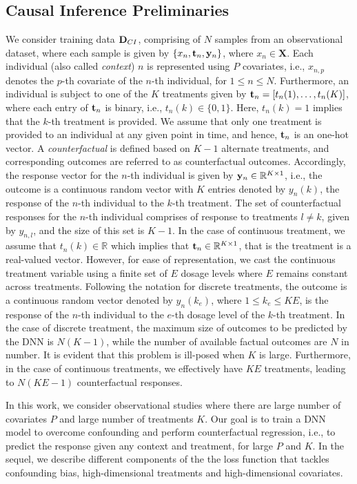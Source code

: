 \documentclass[twoside,11pt]{article}
\begin{document}
\subsection{Causal Inference Preliminaries}
\label{sec:prelim}
We consider training data $\mathbf{D}_{CI}$, comprising of $N$ samples from an observational dataset, where each sample is given by $\{x_n,\mathbf{t}_n,\mathbf{y}_{n}\}$, where $x_n \in \mathbf{X}$. Each individual (also called \textit{context}) $n$ is represented using $P$ covariates, i.e., $x_{n,p}$ denotes the $p$-th covariate of the $n$-th individual, for $1\leq n \leq N$. Furthermore, an individual is subject to one of the $K$ treatments given by $\mathbf{t}_n = [t_n(1), \hdots, t_n(K)]$, where each entry of $\mathbf{t}_n$ is binary, i.e., $t_n(k) \in \{0,1\}$. Here, $t_n(k) = 1$ implies that the $k$-th treatment is provided. We assume that only one treatment is provided to an individual at any given point in time, and hence, $\mathbf{t}_n$ is an one-hot vector. A \emph{counterfactual} is defined based on $K-1$ alternate treatments, and corresponding outcomes are referred to as counterfactual outcomes. Accordingly, the response vector for the $n$-th individual is given by $\mathbf{y}_{n} \in \mathbb{R}^{K \times 1}$, i.e., the outcome is a continuous random vector with $K$ entries denoted by $y_{n}(k)$, the response of the $n$-th individual to the $k$-th treatment. The set of counterfactual responses for the $n$-th individual comprises of response to treatments $l \neq k$, given by $y_{n,l}$, and the size of this set is $K-1$. In the case of continuous treatment, we assume that $t_n(k) \in \mathbb{R}$ which implies that $\mathbf{t}_n \in \mathbb{R}^{K \times 1}$, that is the treatment is a real-valued vector. However, for ease of representation, we cast the continuous treatment variable using a finite set of $E$ dosage levels where $E$ remains constant across treatments. Following the notation for discrete treatments, the outcome is a continuous random vector denoted by $y_{n}(k_e)$, where $1 \leq k_e \leq KE$, is the response of the $n$-th individual to the $e$-th dosage level of the $k$-th treatment. In the case of discrete treatment, the maximum size of outcomes to be predicted by the DNN is $N(K-1)$, while the number of available factual outcomes are $N$ in number. It is evident that this problem is ill-posed when $K$ is large. Furthermore, in the case of continuous treatments, we effectively have $KE$ treatments, leading to $N(KE-1)$ counterfactual responses. 

In this work, we consider observational studies where there are large number of covariates $P$ and large number of treatments $K$. Our goal is to train a DNN model to overcome confounding and perform counterfactual regression, i.e., to predict the response given any context and treatment, for large $P$ and $K$. In the sequel, we describe different components of the the loss function that tackles confounding bias, high-dimensional treatments and high-dimensional covariates.  
\end{document}
